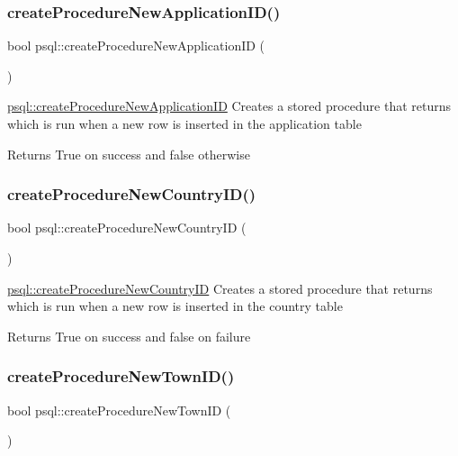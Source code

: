 \subsubsection{\texorpdfstring{create\+Procedure\+New\+Application\+I\+D()}{createProcedureNewApplicationID()}}
{\footnotesize\ttfamily bool psql\+::create\+Procedure\+New\+Application\+ID (\begin{DoxyParamCaption}{ }\end{DoxyParamCaption})}



\hyperlink{classpsql_ae9e3ee06f4a5ecd4178662dfa0655fe1}{psql\+::create\+Procedure\+New\+Application\+ID} Creates a stored procedure that returns which is run when a new row is inserted in the application table 

\begin{DoxyReturn}{Returns}
True on success and false otherwise 
\end{DoxyReturn}
\mbox{\label{classpsql_a565bfc828ecb6b5621354128773494fd}} 
\subsubsection{\texorpdfstring{create\+Procedure\+New\+Country\+I\+D()}{createProcedureNewCountryID()}}
{\footnotesize\ttfamily bool psql\+::create\+Procedure\+New\+Country\+ID (\begin{DoxyParamCaption}{ }\end{DoxyParamCaption})}



\hyperlink{classpsql_a565bfc828ecb6b5621354128773494fd}{psql\+::create\+Procedure\+New\+Country\+ID} Creates a stored procedure that returns which is run when a new row is inserted in the country table 

\begin{DoxyReturn}{Returns}
True on success and false on failure 
\end{DoxyReturn}
\mbox{\label{classpsql_ade0c7fa4f019c3f349230af09b1de49e}} 
\subsubsection{\texorpdfstring{create\+Procedure\+New\+Town\+I\+D()}{createProcedureNewTownID()}}
{\footnotesize\ttfamily bool psql\+::create\+Procedure\+New\+Town\+ID (\begin{DoxyParamCaption}{ }\end{DoxyParamCaption})}



